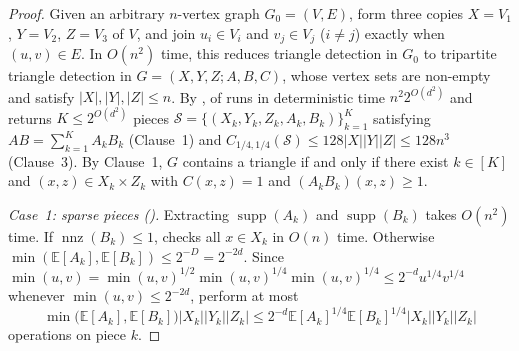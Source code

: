 \documentclass[11pt]{article}
\theoremstyle{definition}
\renewcommand{\label}[1]{}%
\newcommand{\E}{\mathbb{E}}
\newcommand{\supp}{\operatorname{supp}}
\newcommand{\nnz}{\operatorname{nnz}}
\newcommand{\abs}[1]{\left\lvert #1 \right\rvert}
\newcommand{\dens}[1]{\E[#1]}
\newcommand{\pot}{C_{1/4,1/4}}
\begin{document}
\begin{proof}
Given an arbitrary $n$-vertex graph $G_0 = (V, E)$, form three copies $X = V_1$, $Y = V_2$, $Z = V_3$ of $V$, and join $u_i \in V_i$ and $v_j \in V_j$ ($i \ne j$) exactly when $(u, v) \in E$. In $O(n^2)$ time, this reduces triangle detection in $G_0$ to tripartite triangle detection in $G = (X, Y, Z; A, B, C)$, whose vertex sets are non-empty and satisfy $\abs{X}, \abs{Y}, \abs{Z} \le n$. By ,  of  runs in deterministic time $n^2 2^{O(d^2)}$ and returns $K \le 2^{O(d^2)}$ pieces $\mathcal{S} = \{(X_k, Y_k, Z_k, A_k, B_k)\}_{k=1}^K$ satisfying $AB = \sum_{k=1}^K A_k B_k$ (Clause~1) and $\pot(\mathcal{S}) \le 128\abs{X}\abs{Y}\abs{Z} \le 128 n^3$ (Clause~3). By Clause~1, $G$ contains a triangle if and only if there exist $k \in [K]$ and $(x, z) \in X_k \times Z_k$ with $C(x, z) = 1$ and $(A_k B_k)(x, z) \ge 1$.

\emph{Case~1: sparse pieces ().} Extracting $\supp(A_k)$ and $\supp(B_k)$ takes $O(n^2)$ time. If $\nnz(B_k) \le 1$,  checks all $x \in X_k$ in $O(n)$ time. Otherwise $\min(\dens{A_k}, \dens{B_k}) \le 2^{-D} = 2^{-2d}$. Since $\min(u, v) = \min(u, v)^{1/2}\min(u, v)^{1/4}\min(u, v)^{1/4} \le 2^{-d} u^{1/4} v^{1/4}$ whenever $\min(u, v) \le 2^{-2d}$,  perform at most
\begin{equation}\label{eq:tridet-case1}
    \min\!\big(\dens{A_k}, \dens{B_k}\big)\abs{X_k}\abs{Y_k}\abs{Z_k} \le 2^{-d}\dens{A_k}^{1/4}\dens{B_k}^{1/4}\abs{X_k}\abs{Y_k}\abs{Z_k}
\end{equation}
operations on piece $k$.


\end{proof}
\end{document}
